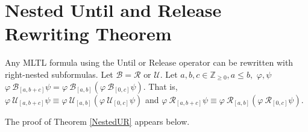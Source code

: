 \documentclass[runningheads]{llncs}
\renewcommand{\phi}{\varphi}
\begin{document}
\section{Nested Until and Release Rewriting Theorem} \label{Appendix-NestedUR}
\begingroup
\renewcommand\thetheorem{3}
 \begin{theorem} \label{NestedUR}
   Any MLTL formula using the Until or Release operator can be rewritten with right-nested subformulas. Let $\mathcal{B} = \mathcal{R} \text{ or } \mathcal{U}$. Let $a,b,c \in \mathbb{Z}_{\geq 0} , a \leq b,$  $ \phi,   \psi$  $ \phi \ \mathcal{B}_{[a,b+c]} \psi = \phi \ \mathcal{B}_{[a,b]}(\phi \ \mathcal{B}_{[0,c]} \psi)$. That is, $ \phi \ \mathcal{U}_{[a,b+c]} \psi \equiv \phi \ \mathcal{U}_{[a,b]}(\phi \ \mathcal{U}_{[0,c]} \psi)$ and $ \phi \ \mathcal{R}_{[a,b+c]} \psi \equiv \phi \ \mathcal{R}_{[a,b]}(\phi \ \mathcal{R}_{[0,c]} \psi)$.
\end{theorem}
\endgroup
The proof of Theorem \ref{NestedUR} appears below.
\end{document}
